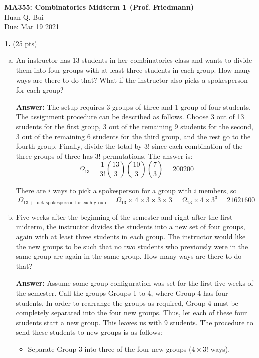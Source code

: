 \documentclass[11pt]{article}
\newcommand{\f}[2]{\frac{#1}{#2}}
\begin{document}
	\begin{framed}
\begin{center}
{\large \bf MA355: Combinatorics Midterm 1 (Prof. Friedmann)}\\
{ Huan Q. Bui}\\
Due: Mar 19 2021
\end{center}
\end{framed}

\noindent \textbf{1.} (25 pts) 
\begin{enumerate}[(a)]
	\item An instructor has 13 students in her combinatorics class and wants to divide them
	into four groups with at least three students in each group. How many ways are
	there to do that? What if the instructor also picks a spokesperson for each group?
	
	\textbf{Answer:} The setup requires 3 groups of three and 1 group of four students. The assignment procedure can be described as follows. Choose 3 out of 13 students for the first group, 3 out of the remaining 9 students for the second, 3 out of the remaining 6 students for the third group, and the rest go to the fourth group. Finally, divide the total by $3!$ since each combination of the three groups of three has $3!$ permutations. The answer is:
	\begin{equation*}
	\boxed{\Omega_{13} = \f{1}{3!}\binom{13}{3}\binom{10}{3}\binom{7}{3} = 200200}
	\end{equation*}
	
	There are $i$ ways to pick a spokesperson for a group with $i$ members, so
	\begin{equation*}
	\boxed{\Omega_\text{13 + pick spokesperson for each group} = \Omega_{13} \times 4\times 3 \times 3 \times 3 = \Omega_{13} \times 4\times 3^3 = 21621600}
	\end{equation*} 
	
	
	\item Five weeks after the beginning of the semester and right after the first midterm,
	the instructor divides the students into a new set of four groups, again with at least
	three students in each group. The instructor would like the new groups to be such
	that no two students who previously were in the same group are again in the same
	group. How many ways are there to do that?

	
	
	\textbf{Answer:} Assume some group configuration was set for the first five weeks of the semester. Call the groups Groups 1 to 4, where Group 4 has four students. In order to rearrange the groups as required, Group 4 must be completely separated into the four new groups. Thus, let each of these four students start a new group. This leaves us with 9 students. The procedure to send these students to new groups is as follows:
	\begin{itemize}
		\item Separate Group 3 into three of the four new groups ($4\times 3!$ ways).
		

\end{itemize}
\end{enumerate}
\end{document}
